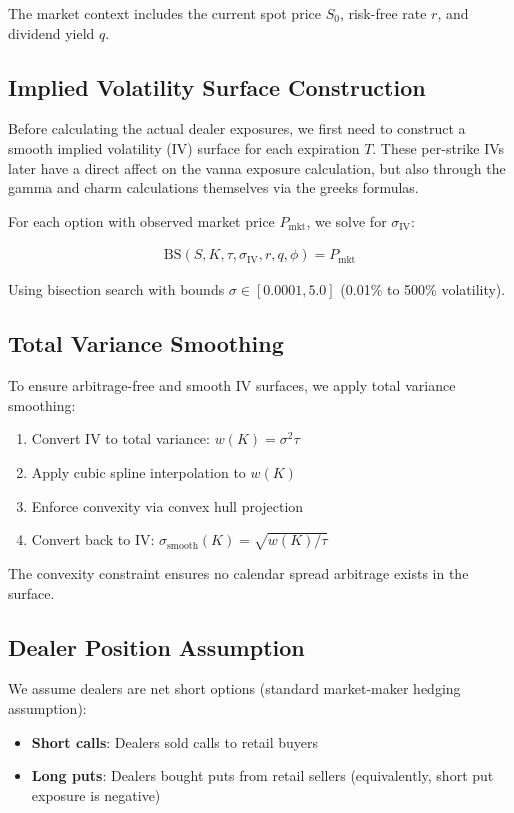 \documentclass[11pt, a4paper]{article}
\begin{document}
The market context includes the current spot price $S_0$, risk-free rate $r$, and dividend yield $q$.

\subsection{Implied Volatility Surface Construction}

Before calculating the actual dealer exposures, we first need to construct a smooth implied volatility (IV) surface for each expiration $T$. These per-strike IVs later have a direct affect on the vanna exposure calculation, but also through the gamma and charm calculations themselves via the greeks formulas.

For each option with observed market price $P_{\text{mkt}}$, we solve for $\sigma_{\text{IV}}$:

\begin{align}
\text{BS}(S, K, \tau, \sigma_{\text{IV}}, r, q, \phi) = P_{\text{mkt}}
\end{align}

Using bisection search with bounds $\sigma \in [0.0001, 5.0]$ (0.01\% to 500\% volatility).

\subsection{Total Variance Smoothing}

To ensure arbitrage-free and smooth IV surfaces, we apply total variance smoothing:

\begin{enumerate}
    \item Convert IV to total variance: $w(K) = \sigma^2 \tau$
    \item Apply cubic spline interpolation to $w(K)$
    \item Enforce convexity via convex hull projection
    \item Convert back to IV: $\sigma_{\text{smooth}}(K) = \sqrt{w(K)/\tau}$
\end{enumerate}

The convexity constraint ensures no calendar spread arbitrage exists in the surface.

\subsection{Dealer Position Assumption}

We assume dealers are net short options (standard market-maker hedging assumption):
\begin{itemize}
    \item \textbf{Short calls}: Dealers sold calls to retail buyers
    \item \textbf{Long puts}: Dealers bought puts from retail sellers (equivalently, short put exposure is negative)
\end{itemize}
\end{document}
